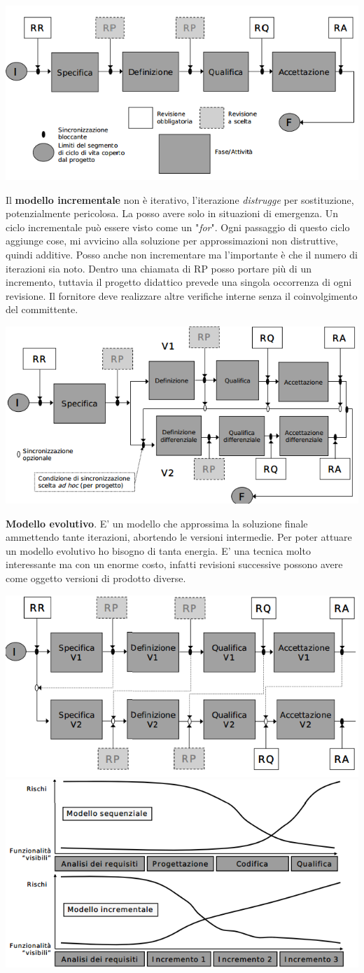 \includegraphics[width=0.5\columnwidth]{img1}

Il \textbf{modello incrementale} non è iterativo, l'iterazione \textit{distrugge} per sostituzione, potenzialmente pericolosa. La posso avere solo in situazioni di emergenza. Un ciclo incrementale può essere visto come un "\textit{for}". Ogni passaggio di questo ciclo aggiunge cose, mi avvicino alla soluzione per approssimazioni non distruttive, quindi additive. Posso anche non incrementare ma l'importante è che il numero di iterazioni sia noto. Dentro una chiamata di RP posso portare più di un incremento, tuttavia il progetto didattico prevede una singola occorrenza di ogni revisione. Il fornitore deve realizzare altre verifiche interne senza il coinvolgimento del committente.

\includegraphics[width=0.5\columnwidth]{img2}

\textbf{Modello evolutivo}. E' un modello che approssima la soluzione finale ammettendo tante iterazioni, abortendo le versioni intermedie. Per poter attuare un modello evolutivo ho bisogno di tanta energia. E' una tecnica molto interessante ma con un enorme costo, infatti revisioni successive possono avere come oggetto versioni di prodotto diverse.

\includegraphics[width=0.4\columnwidth]{img3}
\includegraphics[width=0.4\columnwidth]{img4}

